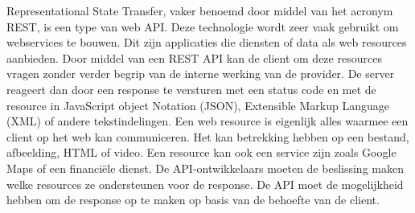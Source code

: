 Representational State Transfer, vaker benoemd door middel van het acronym REST, is een type van web API. Deze technologie wordt zeer vaak gebruikt om webservices te bouwen.
Dit zijn applicaties die diensten of data als web resources aanbieden. Door middel van een REST API kan de client om deze resources vragen zonder verder
begrip van de interne werking van de provider. De server reageert dan door een response te versturen met een status code en met de resource in JavaScript object Notation (JSON),
Extensible Markup Language (XML) of andere tekstindelingen. Een web resource is eigenlijk alles waarmee een client op het web kan communiceren.
Het kan betrekking hebben op een bestand, afbeelding, HTML of video. Een resource kan ook een service zijn zoals Google Maps of een financiële dienst.
De API-ontwikkelaars moeten de beslissing maken welke resources ze ondersteunen voor de response.
De API moet de mogelijkheid hebben om de response op te maken op basis van de behoefte van de client.
~\autocite{uptrends}
~\autocite{guru99-webservices}\\

